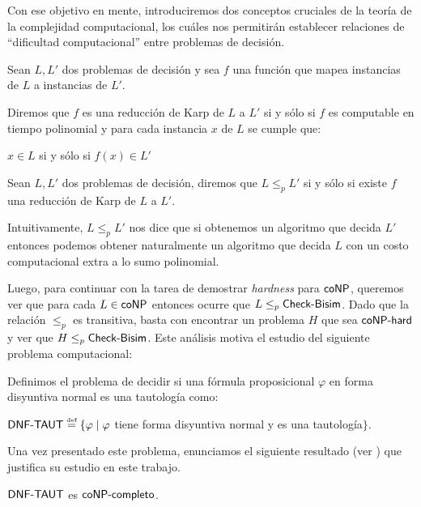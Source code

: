 Con ese objetivo en mente, introduciremos dos conceptos cruciales de la teoría de la complejidad computacional, los cuáles nos permitirán 
establecer relaciones de ``dificultad computacional'' entre problemas de decisión.

\begin{definicion}
    Sean $L, L'$ dos problemas de decisión y sea $f$ una función que mapea instancias de $L$ a instancias de $L'$.

    Diremos que $f$ es una reducción de Karp de $L$ a $L'$ si y sólo si $f$ es computable en tiempo polinomial y para cada instancia $x$ de $L$ 
    se cumple que:

    \begin{center}
        $x \in L$ si y sólo si $f(x) \in L'$
    \end{center}
\end{definicion}

\begin{definicion}[$\leq_p$]
    Sean $L, L'$ dos problemas de decisión, diremos que $L \leq_p L'$ si y sólo si existe $f$ una reducción de Karp de $L$ a 
    $L'$. 
\end{definicion}

Intuitivamente, $L \leq_p L'$ nos dice que si obtenemos un algoritmo que decida $L'$ entonces podemos obtener naturalmente un algoritmo 
que decida $L$ con un costo computacional extra a lo sumo polinomial. 

Luego, para continuar con la tarea de demostrar \textit{hardness} para $\rm\textsf{coNP}$, queremos ver que para cada $L \in \rm\textsf{coNP}$ entonces ocurre que 
$L \leq_p \rm\textsf{Check-Bisim}$. Dado que la relación $\leq_p$ es transitiva, basta con encontrar un problema $H$ que sea $\rm\textsf{coNP-hard}$ y ver que 
$H \leq_p \rm\textsf{Check-Bisim}$. Este análisis motiva el estudio del siguiente problema computacional:

\begin{definicion}
    Definimos el problema de decidir si una fórmula proposicional $\varphi$ en forma disyuntiva normal es una tautología como:
    \begin{center}
        $\DNFTAUT \eqdef \{ \varphi \mid \varphi$ tiene forma disyuntiva normal y es una tautología$\}$.
    \end{center}
\end{definicion}

Una vez presentado este problema, enunciamos el siguiente resultado (ver \cite{AroraB09}) que justifica su estudio en este trabajo.

\begin{teorema}\label{thm:dnftaut-conp-complete}
    $\rm\textsf{DNF-TAUT}$ es $\rm\textsf{coNP-completo}$.
\end{teorema}

